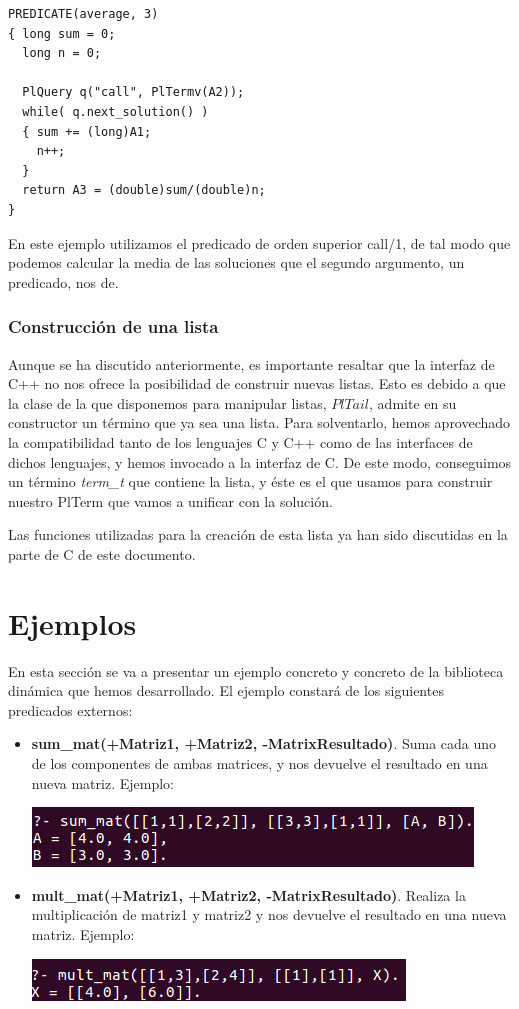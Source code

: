 \documentclass[a4paper]{article}
\begin{document}
\begin{lstlisting}[style=C++]
PREDICATE(average, 3)
{ long sum = 0;
  long n = 0;

  PlQuery q("call", PlTermv(A2));
  while( q.next_solution() )
  { sum += (long)A1;
    n++;
  }
  return A3 = (double)sum/(double)n;
}
\end{lstlisting}

En este ejemplo utilizamos el predicado de orden superior call/1, de tal modo que podemos calcular la media de las soluciones que el segundo argumento, un predicado, nos de.

\subsubsection{Construcción de una lista}

Aunque se ha discutido anteriormente, es importante resaltar que la interfaz de C++ no nos ofrece la posibilidad de construir nuevas listas. Esto es debido a que la clase de la que disponemos para manipular listas, $PlTail$, admite en su constructor un término que ya sea una lista. Para solventarlo, hemos aprovechado la compatibilidad tanto de los lenguajes C y C++ como de las interfaces de dichos lenguajes, y hemos invocado a la interfaz de C. De este modo, conseguimos un término \textit{term\_t} que contiene la lista, y éste es el que usamos para construir nuestro PlTerm que vamos a unificar con la solución. 

Las funciones utilizadas para la creación de esta lista ya han sido discutidas en la parte de C de este documento.

\section{Ejemplos}

En esta sección se va a presentar un ejemplo concreto y concreto de la biblioteca dinámica que hemos desarrollado. El ejemplo constará de los siguientes predicados externos:

\begin{itemize}
\item \textbf{sum\_mat(+Matriz1, +Matriz2, -MatrixResultado)}. Suma cada uno de los componentes de ambas matrices, y nos devuelve el resultado en una nueva matriz. Ejemplo:

\includegraphics[scale=0.6]{EjemploSuma.jpeg}
\item \textbf{mult\_mat(+Matriz1, +Matriz2, -MatrixResultado)}. Realiza la multiplicación de matriz1 y matriz2 y nos devuelve el resultado en una nueva matriz. Ejemplo:

\includegraphics[scale=0.6]{EjemploMult.jpeg}
\end{itemize}
\end{document}
